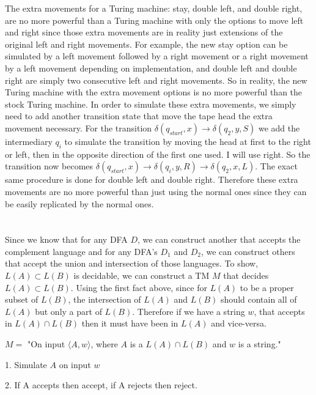 \documentclass[12pt]{article}
\begin{document}
The extra movements for a Turing machine: stay, double left, and double right, are no more powerful than a Turing machine with only the options to move left and right since those extra movements are in reality just extensions of the original left and right movements. For example, the new stay option can be simulated by a left movement followed by a right movement or a right movement by a left movement depending on implementation, and double left and double right are simply two consecutive left and right movements. So in reality, the new Turing machine with the extra movement options is no more powerful than the stock Turing machine. In order to simulate these extra movements, we simply need to add another transition state that move the tape head the extra movement necessary. For the transition $\delta(q_{start},x) \rightarrow \delta(q_{2}, y, S)$ we add the intermediary $q_{i}$ to simulate the transition by moving the head at first to the right or left, then in the opposite direction of the first one used. I will use right. So the transition now becomes $\delta(q_{start},x) \rightarrow \delta(q_{i}, y, R) \rightarrow \delta(q_{2}, x, L)$. The exact same procedure is done for double left and double right. Therefore these extra movements are no more powerful than just using the normal ones since they can be easily replicated by the normal ones.

\pagebreak

\section{}

Since we know that for any DFA $D$, we can construct another that accepts the complement language and for any DFA’s $D_{1}$ and $D_{2}$, we can construct others that accept the union and intersection of those languages. To show, $L(A) \subset L(B)$ is decidable, we can construct a TM $M$ that decides $L(A) \subset L(B)$. Using the first fact above, since for $L(A)$ to be a proper subset of $L(B)$, the intersection of $L(A)$ and $L(B)$ should contain all of $L(A)$ but only a part of $L(B)$. Therefore if we have a string $w$, that accepts in $L(A) \cap L(B)$ then it must have been in $L(A)$ and vice-versa.

$M = $ "On input $\langle A, w \rangle$, where $A$ is a $L(A)\cap L(B)$ and $w$ is a string."

1. Simulate $A$ on input $w$

2. If A accepts then accept, if A rejects then reject.


\enddocument
 
\end{document}
